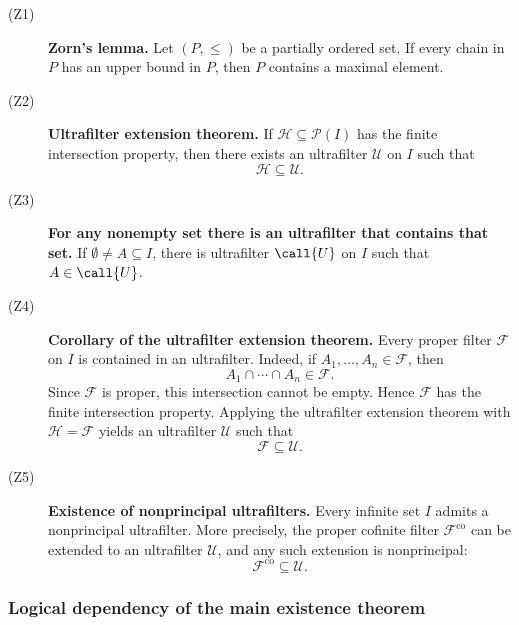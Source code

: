 {\begin{description}
    \item[\textnormal{(Z1)}] \textbf{Zorn's lemma.}
    Let \((P,\leq)\) be a partially ordered set. If every chain in \(P\)
    has an upper bound in \(P\), then \(P\) contains a maximal element.

    \item[\textnormal{(Z2)}] \textbf{Ultrafilter extension theorem.}
    If \(\mathcal{H}\subseteq\mathcal{P}(I)\) has the finite intersection
    property, then there exists an ultrafilter \(\mathcal{U}\) on \(I\)
    such that
    \[
    \mathcal{H}\subseteq\mathcal{U}.
    \]

    \item[\textnormal{(Z3)}] \textbf{For any nonempty set there is an ultrafilter that contains that set.}
    If $\emptyset \neq A \subseteq I$, there is ultrafilter $\call{U}$ on $I$ such that $A \in \call{U}$.

    \item[\textnormal{(Z4)}]
\textbf{Corollary of the ultrafilter extension theorem.}
Every proper filter \(\mathcal{F}\) on \(I\) is contained in an ultrafilter.
Indeed, if \(A_1,\ldots,A_n\in\mathcal{F}\), then
\[
A_1\cap\cdots\cap A_n\in\mathcal{F}.
\]
Since \(\mathcal{F}\) is proper, this intersection cannot be empty. Hence
\(\mathcal{F}\) has the finite intersection property. Applying the
ultrafilter extension theorem with \(\mathcal{H}=\mathcal{F}\) yields an
ultrafilter \(\mathcal{U}\) such that
\[
\mathcal{F}\subseteq\mathcal{U}.
\]


    \item[\textnormal{(Z5)}] \textbf{Existence of nonprincipal ultrafilters.}
    Every infinite set \(I\) admits a nonprincipal ultrafilter. More
    precisely, the proper cofinite filter \(\mathcal{F}^{\mathrm{co}}\) can
    be extended to an ultrafilter \(\mathcal{U}\), and any such extension
    is nonprincipal:
    \[
    \mathcal{F}^{\mathrm{co}}
    \subseteq
    \mathcal{U}.
    \]
\end{description}

\subsubsection*{Logical dependency of the main existence theorem}

}

